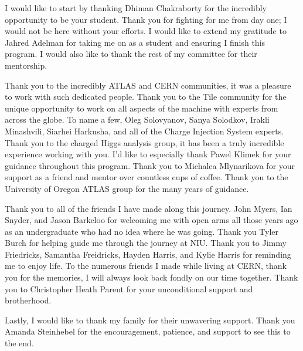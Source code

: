 I would like to start by thanking Dhiman Chakraborty for the incredibly opportunity to be your student. Thank you for fighting for me from day one; I would not be here without your efforts. I would like to extend my gratitude to Jahred Adelman for taking me on as a student and ensuring I finish this program. I would also like to thank the rest of my committee for their mentorship. 

Thank you to the incredibly ATLAS and CERN communities, it was a pleasure to work with such dedicated people. Thank you to the Tile community for the unique opportunity to work on all aspects of the machine with experts from across the globe. To name a few, Oleg Solovyanov, Sanya Solodkov, Irakli Minashvili, Siarhei Harkusha, and all of the Charge Injection System experts. Thank you to the charged Higgs analysis group, it has been a truly incredible experience working with you. I'd like to especially thank Pawel Klimek for your guidance throughout this program. Thank you to Michalea Mlynarikova for your support as a friend and mentor over countless cups of coffee. Thank you to the University of Oregon ATLAS group for the many years of guidance.

Thank you to all of the friends I have made along this journey. John Myers, Ian Snyder, and Jason Barkeloo for welcoming me with open arms all those years ago as an undergraduate who had no idea where he was going. Thank you Tyler Burch for helping guide me through the journey at NIU. Thank you to Jimmy Friedricks, Samantha Freidricks, Hayden Harris, and Kylie Harris for reminding me to enjoy life. To the numerous friends I made while living at CERN, thank you for the memories, I will always look back fondly on our time together. Thank you to Christopher Heath Parent for your unconditional support and brotherhood.

Lastly, I would like to thank my family for their unwavering support. Thank you Amanda Steinhebel for the encouragement, patience, and support to see this to the end.
